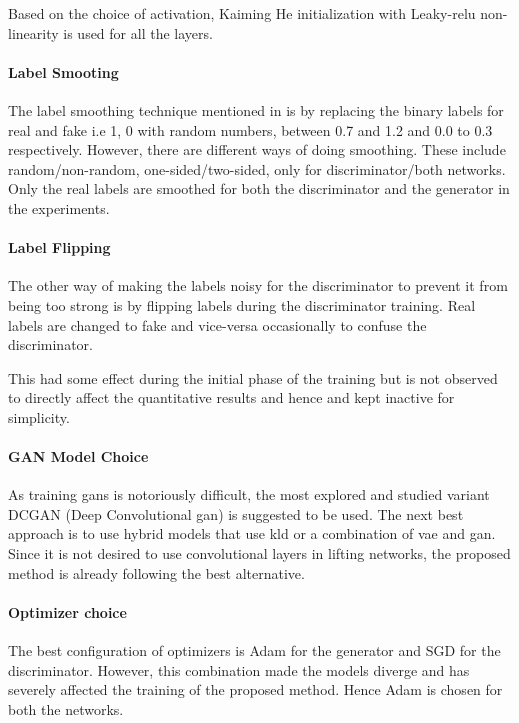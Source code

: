 Based on the choice of activation, Kaiming He initialization with Leaky-\ac{relu} non-linearity is used for all the layers.

\paragraph{Label Smooting}
The label smoothing technique mentioned in \cite{gan_hacks} is by replacing the binary labels for real and fake i.e 1, 0 with random numbers, between 0.7 and 1.2 and 0.0 to 0.3 respectively. However, there are different ways of doing smoothing. These include random/non-random, one-sided/two-sided, only for discriminator/both networks. Only the real labels are smoothed for both the discriminator and the generator in the experiments. 

\paragraph{Label Flipping}
The other way of making the labels noisy for the discriminator to prevent it from being too strong is by flipping labels during the discriminator training. Real labels are changed to fake and vice-versa occasionally to confuse the discriminator. 

This had some effect during the initial phase of the training but is not observed to directly affect the quantitative results and hence and kept inactive for simplicity.

\paragraph{GAN Model Choice} 
As training \acp{gan} is notoriously difficult, the most explored and studied variant DCGAN (Deep Convolutional \ac{gan}) is suggested to be used. The next best approach is to use hybrid models that use \ac{kld} or a combination of \ac{vae} and \ac{gan}. Since it is not desired to use convolutional layers in lifting networks, the proposed method is already following the best alternative.


\paragraph{Optimizer choice}
The best configuration of optimizers is Adam for the generator and SGD for the discriminator. However, this combination made the models diverge and has severely affected the training of the proposed method. Hence Adam is chosen for both the networks.

